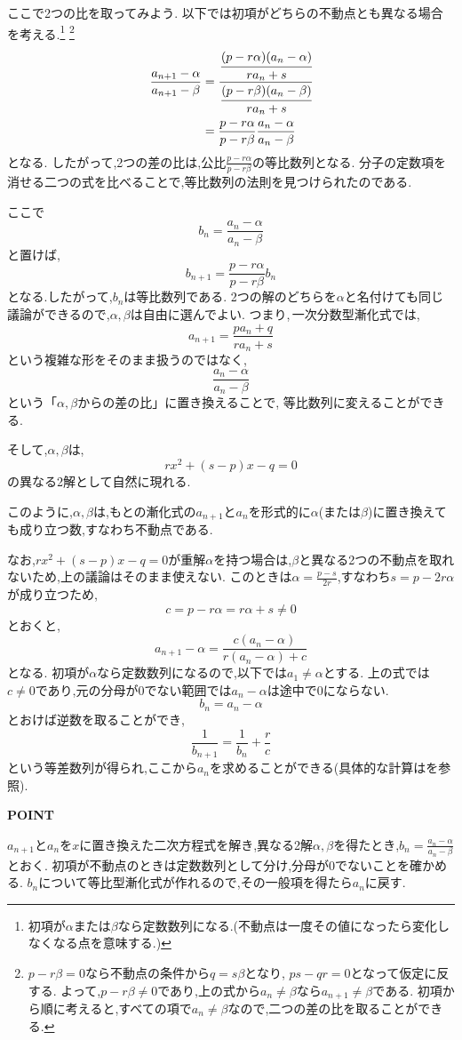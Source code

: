 ここで2つの比を取ってみよう.
以下では初項がどちらの不動点とも異なる場合を考える.\footnote{初項が$\alpha$または$\beta$なら定数数列になる.(不動点は一度その値になったら変化しなくなる点を意味する.)}
\footnote{$p-r\beta=0$なら不動点の条件から$q=s\beta$となり, $ps-qr=0$となって仮定に反する.
よって,$p-r\beta\ne0$であり,上の式から$a_n\ne\beta$なら$a_{n+1}\ne\beta$である.
初項から順に考えると,すべての項で$a_n\ne\beta$なので,二つの差の比を取ることができる.}
\begin{align*}
  \frac{a_{n+1}-\alpha}{a_{n+1}-\beta}
  &=\cfrac{
    \cfrac{(p-r\alpha)(a_n-\alpha)}{ra_n+s}}
    {
    \cfrac{(p-r\beta)(a_n-\beta)}{ra_n+s}}\\
  &=\frac{p-r\alpha}{p-r\beta}
    \frac{a_n-\alpha}{a_n-\beta}
\end{align*}
となる.
したがって,2つの差の比は,公比$\frac{p-r\alpha}{p-r\beta}$の等比数列となる.
分子の定数項を消せる二つの式を比べることで,等比数列の法則を見つけられたのである.

ここで
\[
  b_n=\frac{a_n-\alpha}{a_n-\beta}
\]
と置けば,
\[
  b_{n+1}
  =
  \frac{p-r\alpha}{p-r\beta}b_n
\]
となる.したがって,$b_n$は等比数列である.
2つの解のどちらを$\alpha$と名付けても同じ議論ができるので,$\alpha,\beta$は自由に選んでよい.
つまり,\,一次分数型漸化式では,
\[
  a_{n+1}=\frac{pa_n+q}{ra_n+s}
\]
という複雑な形をそのまま扱うのではなく,
\[
  \frac{a_n-\alpha}{a_n-\beta}
\]
という「$\alpha,\beta$からの差の比」に置き換えることで,
等比数列に変えることができる.

そして,$\alpha,\beta$は,
\[
  rx^2+(s-p)x-q=0
\]
の異なる2解として自然に現れる.

このように,$\alpha,\beta$は,もとの漸化式の$a_{n+1}$と$a_n$を形式的に$\alpha$(または$\beta$)に置き換えても成り立つ数,すなわち不動点である.

なお,$rx^2+(s-p)x-q=0$が重解$\alpha$を持つ場合は,$\beta$と異なる2つの不動点を取れないため,上の議論はそのまま使えない.
このときは$\alpha=\frac{p-s}{2r}$,すなわち$s=p-2r\alpha$が成り立つため,
\[
  c=p-r\alpha=r\alpha+s\ne0
\]
とおくと,
\[
  a_{n+1}-\alpha
  =\frac{c(a_n-\alpha)}{r(a_n-\alpha)+c}
\]
となる.
初項が$\alpha$なら定数数列になるので,以下では$a_1\ne\alpha$とする.
上の式では$c\ne0$であり,元の分母が0でない範囲では$a_n-\alpha$は途中で0にならない.
\[
  b_n=a_n-\alpha
\]
とおけば逆数を取ることができ,
\[
  \frac1{b_{n+1}}=\frac1{b_n}+\frac rc
\]
という等差数列が得られ,ここから$a_n$を求めることができる(具体的な計算はを参照).

\begin{bookpoint}
  \textbf{POINT}\par
  $a_{n+1}$と$a_n$を$x$に置き換えた二次方程式を解き,異なる2解$\alpha,\beta$を得たとき,$b_n=\frac{a_n-\alpha}{a_n-\beta}$とおく.
  初項が不動点のときは定数数列として分け,分母が0でないことを確かめる.
  $b_n$について等比型漸化式が作れるので,その一般項を得たら$a_n$に戻す.
\end{bookpoint}

